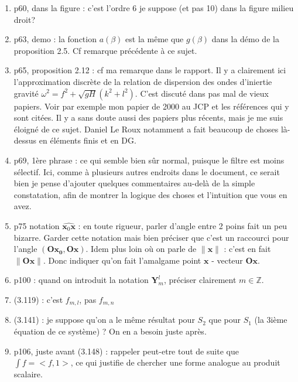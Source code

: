 \documentclass[10pt,a4paper]{article}
\begin{document}
\begin{enumerate}
\item p60, dans la figure : c'est l'ordre 6 je suppose (et pas 10) dans la figure milieu droit?


\item p63, demo : la fonction $a(\beta)$ est la même que $g(\beta)$ dans la démo de la proposition 2.5. Cf remarque précédente à ce sujet.


\item p65, proposition 2.12 : cf ma remarque dans le rapport. Il y a clairement ici l'approximation discrète de la relation de dispersion des ondes d'iniertie gravité $\omega^2 = f^2 + \sqrt{gH}(k^2+l^2)$. C'est discuté dans pas mal de vieux papiers. Voir par exemple mon papier de 2000 au JCP et les références qui y sont citées. Il y a sans doute aussi des papiers plus récents, mais je me suis éloigné de ce sujet. Daniel Le Roux notamment a fait beaucoup de choses là-dessus en éléments finis et en DG.


\item p69, 1ère phrase : ce qui semble bien sûr normal, puisque le filtre est moins sélectif. Ici, comme à plusieurs autres endroits dans le document, ce serait bien je pense d'ajouter quelques commentaires au-delà de la simple constatation, afin de montrer la logique des choses et l'intuition que vous en avez.


\item p75 notation $\widehat{\mathbf{x}_0 \mathbf{x}}$ : en toute rigueur, parler d'angle entre 2 poins fait un peu bizarre. Garder cette notation mais bien préciser que c'est un raccourci pour l'angle $(\mathbf{Ox_0}, \mathbf{Ox})$. Idem plus loin où on parle de $\| \mathbf{x} \|$ : c'est en fait $\| \mathbf{Ox} \|$. Donc indiquer qu'on fait l'amalgame point $\mathbf{x}$ - vecteur $\mathbf{Ox}$.


\item p100 : quand on introduit la notation $\mathbf{Y}_m^l$, préciser clairement $m \in \mathbb{Z}$.


\item (3.119) : c'est $f_{m,l}$, pas $f_{m,n}$


\item (3.141) : je suppose qu'on a le même résultat pour $S_2$ que pour $S_1$ (la 3ième équation de ce système) ? On en a besoin juste après.


\item p106, juste avant (3.148) : rappeler peut-etre tout de suite que $\int f = <f,1>$, ce qui justifie de chercher une forme analogue au produit scalaire.




\end{enumerate}
\end{document}
